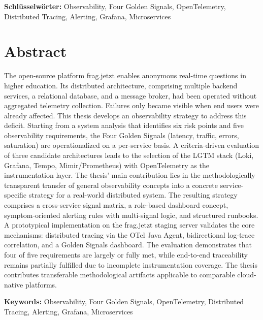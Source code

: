 \textbf{Schlüsselwörter:} Observability, Four Golden Signals, OpenTelemetry, Distributed Tracing, Alerting, Grafana, Microservices
\par
\endgroup

\chapter*{Abstract}

\begingroup
\setlength{\parskip}{0.5em}
The open-source platform frag.jetzt enables anonymous real-time questions in higher education. Its distributed architecture, comprising multiple backend services, a relational database, and a message broker, had been operated without aggregated telemetry collection. Failures only became visible when end users were already affected. This thesis develops an observability strategy to address this deficit. Starting from a system analysis that identifies six risk points and five observability requirements, the Four Golden Signals (latency, traffic, errors, saturation) are operationalized on a per-service basis. A criteria-driven evaluation of three candidate architectures leads to the selection of the LGTM stack (Loki, Grafana, Tempo, Mimir/Prometheus) with OpenTelemetry as the instrumentation layer. The thesis’ main contribution lies in the methodologically transparent transfer of general observability concepts into a concrete service-specific strategy for a real-world distributed system. The resulting strategy comprises a cross-service signal matrix, a role-based dashboard concept, symptom-oriented alerting rules with multi-signal logic, and structured runbooks. A prototypical implementation on the frag.jetzt staging server validates the core mechanisms: distributed tracing via the OTel Java Agent, bidirectional log-trace correlation, and a Golden Signals dashboard. The evaluation demonstrates that four of five requirements are largely or fully met, while end-to-end traceability remains partially fulfilled due to incomplete instrumentation coverage. The thesis contributes transferable methodological artifacts applicable to comparable cloud-native platforms.

\textbf{Keywords:} Observability, Four Golden Signals, OpenTelemetry, Distributed Tracing, Alerting, Grafana, Microservices
\par
\endgroup

\cleardoublepage
